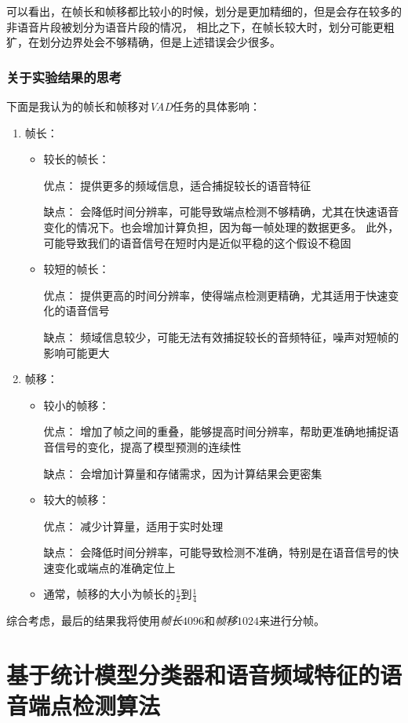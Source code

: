 \documentclass[a4paper]{article}
\begin{document}
可以看出，在帧长和帧移都比较小的时候，划分是更加精细的，但是会存在较多的非语音片段被划分为语音片段的情况，
相比之下，在帧长较大时，划分可能更粗犷，在划分边界处会不够精确，但是上述错误会少很多。

\subsubsection{关于实验结果的思考}
下面是我认为的帧长和帧移对\emph{VAD}任务的具体影响：
\begin{enumerate}
  \item 
  {
    帧长：
    \begin{itemize}
      \item 较长的帧长：

      优点： 提供更多的频域信息，适合捕捉较长的语音特征
      
      缺点： 会降低时间分辨率，可能导致端点检测不够精确，尤其在快速语音变化的情况下。也会增加计算负担，因为每一帧处理的数据更多。
      此外，可能导致我们的语音信号在短时内是近似平稳的这个假设不稳固
      \item 较短的帧长：

      优点： 提供更高的时间分辨率，使得端点检测更精确，尤其适用于快速变化的语音信号
      
      缺点： 频域信息较少，可能无法有效捕捉较长的音频特征，噪声对短帧的影响可能更大
    \end{itemize}
  }
  \item 
  {
    帧移：
    \begin{itemize}
      \item 较小的帧移：

      优点： 增加了帧之间的重叠，能够提高时间分辨率，帮助更准确地捕捉语音信号的变化，提高了模型预测的连续性
      
      缺点： 会增加计算量和存储需求，因为计算结果会更密集
      \item 较大的帧移：

      优点： 减少计算量，适用于实时处理
      
      缺点： 会降低时间分辨率，可能导致检测不准确，特别是在语音信号的快速变化或端点的准确定位上
      \item 通常，帧移的大小为帧长的$\frac{1}{2}$到$\frac{1}{4}$
    \end{itemize}
  }
\end{enumerate}

综合考虑，最后的结果我将使用\emph{帧长$4096$}和\emph{帧移$1024$}来进行分帧。

\section{基于统计模型分类器和语音频域特征的语音端点检测算法}
\end{document}
